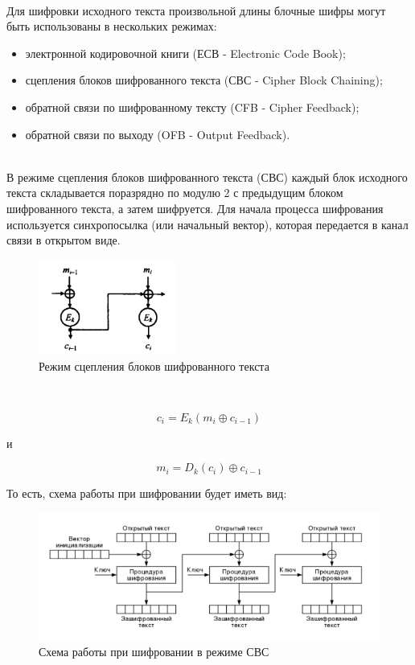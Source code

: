 \documentclass[oneside,final,14pt]{extreport}
\begin{document}
~\




Для шифровки исходного текста произвольной длины блочные
шифры могут быть использованы в нескольких режимах:\\

\begin{itemize}
\item электронной кодировочной книги (ЕСВ - Electronic Code
Book);
\item сцепления блоков шифрованного текста (СВС - Cipher
Block Chaining);
\item  обратной связи по шифрованному тексту (CFB - Cipher
Feedback);
\item обратной связи по выходу (OFB - Output Feedback).
\end{itemize}
\\


В режиме сцепления блоков шифрованного текста (СВС)
каждый блок исходного текста складывается поразрядно по модулю 2
с предыдущим блоком шифрованного текста, а затем шифруется. Для начала процесса шифрования используется синхропосылка (или начальный вектор), которая передается в канал
связи в открытом виде.\\

\begin{figure}[h!]
\includegraphics[width=0.4\textwidth]{6.png}
\caption{Режим сцепления блоков шифрованного текста}
\end{figure}




~\


\[c_{i} = E_{k}(m_{i}\oplus c_{i -1} )\]

и

\[m_{i} = D_{k}(c_{i})\oplus c_{i-1}\] 



То есть, схема работы при шифровании будет иметь вид:\\

\begin{figure}[h!]
\includegraphics[width=1\textwidth]{7.png}
\caption{Схема работы при шифровании в режиме СВС}

\end{figure}
\end{document}
